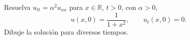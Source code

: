 Resuelva $u_{tt}=\alpha^2u_{xx}$ para $x\in\mathbb R$, $t>0$, con $\alpha>0$, \[u(x,0)=\frac1{1+x^2},\qquad u_t(x,0)=0.\] Dibuje la solución para diversos tiempos.
